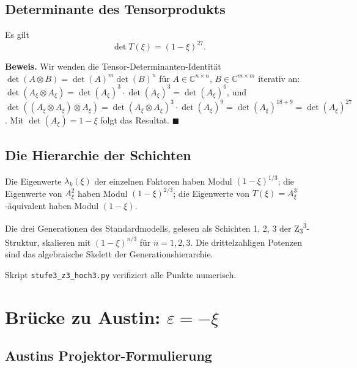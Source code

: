 \subsection{Determinante des Tensorprodukts}

\begin{keyresult}
Es gilt
\begin{equation}
\det T(\xi) = (1 - \xi)^{27}.
\label{eq:detT}
\end{equation}
\end{keyresult}

\noindent\textbf{Beweis.} Wir wenden die Tensor-Determinanten-Identität \(\det(A \otimes B) = \det(A)^m \det(B)^n\) für \(A \in \mathbb{C}^{n \times n}\), \(B \in \mathbb{C}^{m \times m}\) iterativ an: \(\det(A_\xi \otimes A_\xi) = \det(A_\xi)^3 \cdot \det(A_\xi)^3 = \det(A_\xi)^6\), und \(\det((A_\xi \otimes A_\xi) \otimes A_\xi) = \det(A_\xi \otimes A_\xi)^3 \cdot \det(A_\xi)^9 = \det(A_\xi)^{18+9} = \det(A_\xi)^{27}\). Mit \(\det(A_\xi) = 1 - \xi\) folgt das Resultat. \(\blacksquare\)

\subsection{Die Hierarchie der Schichten}

Die Eigenwerte \(\lambda_k(\xi)\) der einzelnen Faktoren haben Modul \((1-\xi)^{1/3}\); die Eigenwerte von \(A_\xi^2\) haben Modul \((1-\xi)^{2/3}\); die Eigenwerte von \(T(\xi) = A_\xi^3\)-äquivalent haben Modul \((1-\xi)\).

\begin{insightBox}
Die drei Generationen des Standardmodells, gelesen als Schichten 1, 2, 3 der Z\textsubscript{3}\textsuperscript{3}-Struktur, skalieren mit \((1-\xi)^{n/3}\) für \(n = 1, 2, 3\). Die drittelzahligen Potenzen sind das algebraische Skelett der Generationshierarchie.
\end{insightBox}

Skript \texttt{stufe3\_z3\_hoch3.py} verifiziert alle Punkte numerisch.

\section[Brücke zu Austin: epsilon = -xi]{Brücke zu Austin: \(\varepsilon = -\xi\)}
\label{sec:austin}

\subsection{Austins Projektor-Formulierung}

